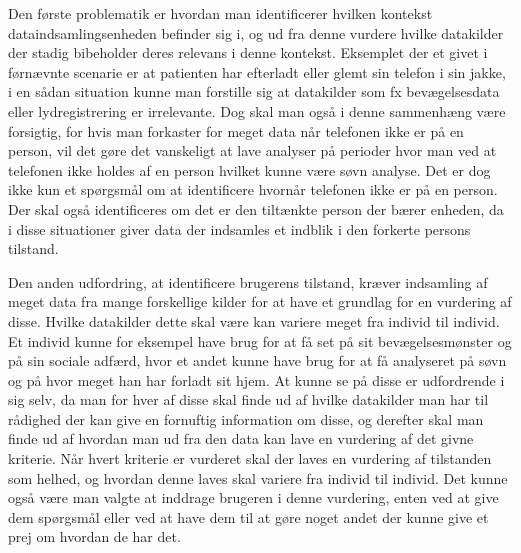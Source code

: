 Den første problematik er hvordan man identificerer hvilken kontekst dataindsamlingsenheden befinder sig i, og ud fra denne vurdere hvilke datakilder der stadig bibeholder deres relevans i denne kontekst.
Eksemplet der et givet i førnævnte scenarie er at patienten har efterladt eller glemt sin telefon i sin jakke, i en sådan situation kunne man forstille sig at datakilder som fx bevægelsesdata eller lydregistrering er irrelevante.
Dog skal man også i denne sammenhæng være forsigtig, for hvis man forkaster for meget data når telefonen ikke er på en person, vil det gøre det vanskeligt at lave analyser på perioder hvor man ved at telefonen ikke holdes af en person hvilket kunne være søvn analyse. 
Det er dog ikke kun et spørgsmål om at identificere hvornår telefonen ikke er på en person.
Der skal også identificeres om det er den tiltænkte person der bærer enheden, da i disse situationer giver data der indsamles et indblik i den forkerte persons tilstand.

Den anden udfordring, at identificere brugerens tilstand, kræver indsamling af meget data fra mange forskellige kilder for at have et grundlag for en vurdering af disse.
Hvilke datakilder dette skal være kan variere meget fra individ til individ.
Et individ kunne for eksempel have brug for at få set på sit bevægelsesmønster og på sin sociale adfærd, hvor et andet kunne have brug for at få analyseret på søvn og på hvor meget han har forladt sit hjem.
At kunne se på disse er udfordrende i sig selv, da man for hver af disse skal finde ud af hvilke datakilder man har til rådighed der kan give en fornuftig information om disse, og derefter skal man finde ud af hvordan man ud fra den data kan lave en vurdering af det givne kriterie.
Når hvert kriterie er vurderet skal der laves en vurdering af tilstanden som helhed, og hvordan denne laves skal variere fra individ til individ.
Det kunne også være man valgte at inddrage brugeren i denne vurdering, enten ved at give dem spørgsmål eller ved at have dem til at gøre noget andet der kunne give et prej om hvordan de har det.

